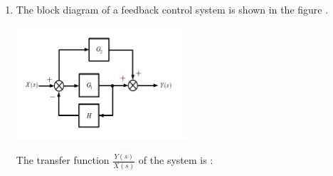 \begin{enumerate}[label=\thechapter.\arabic*,ref=\thechapter.\theenumi]
\item The block diagram of a feedback control system is shown in the figure .
\begin{center}
\includegraphics[width=0.5\textwidth]{2021/EC/13/figs/figure1.png}
\end{center}
The transfer function $\frac{Y(s)}{X(s)}$ of the system is :
\solution

\newpage
\end{enumerate}
